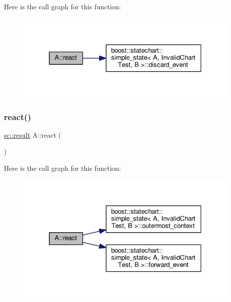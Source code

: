 Here is the call graph for this function\+:
\nopagebreak
\begin{figure}[H]
\begin{center}
\leavevmode
\includegraphics[width=313pt]{struct_a_a7eaee5c73ef0a2a5fb0886b4b1bc4a48_cgraph}
\end{center}
\end{figure}
\mbox{\label{struct_a_a38e1d44955d46136ca8ea912ae202a52}} 
\subsubsection{\texorpdfstring{react()}{react()}\hspace{0.1cm}{\footnotesize\ttfamily [5/11]}}
{\footnotesize\ttfamily \mbox{\hyperlink{namespaceboost_1_1statechart_abe807f6598b614d6d87bb951ecd92331}{sc\+::result}} A\+::react (\begin{DoxyParamCaption}\item[{const \mbox{\hyperlink{struct_ev_discard_never}{Ev\+Discard\+Never}} \&}]{ }\end{DoxyParamCaption})\hspace{0.3cm}{\ttfamily [inline]}}

Here is the call graph for this function\+:
\nopagebreak
\begin{figure}[H]
\begin{center}
\leavevmode
\includegraphics[width=313pt]{struct_a_a38e1d44955d46136ca8ea912ae202a52_cgraph}
\end{center}
\end{figure}
\mbox{\label{struct_a_a59fa7dccf0b31b8a69a6e5607be864d1}} 
